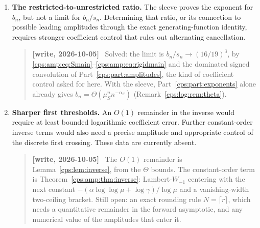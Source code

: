\documentclass[11pt,letterpaper]{article}
\numberwithin{equation}{section}
\theoremstyle{remark}\newtheorem{remark}[theorem]{Remark}
\newenvironment{writenotelog}{\begin{quote}\small\sloppy\textbf{[write, 2026-10-05]}\ }{\end{quote}}
\begin{document}
\begin{enumerate}
\begin{writenotelog}
Still open. The leading equivalents now exist (Theorem~\ref{cps:amp:thm:main}); no rate and no
correction term is proved in any Part.
\end{writenotelog}
\item \textbf{The restricted-to-unrestricted ratio.}
The sleeve proves the exponent for $b_n$, but not a limit for $b_n/s_n$.
Determining that ratio, or its connection to possible leading amplitudes
through the exact generating-function identity, requires stronger
coefficient control that rules out alternating cancellation.

\begin{writenotelog}
Solved: the limit is $b_n/s_n\to(16/19)^3$, by \eqref{cps:amp:eq:Smain}--\eqref{cps:amp:eq:rigidmain}
and the dominated signed convolution of Part~\ref{cps:part:amplitudes}, the kind of coefficient
control asked for here. With the sleeve, Part~\ref{cps:part:exponents} alone already gives
$b_n=\Theta(\mu_S^nn^{-\alpha_S})$ (Remark~\ref{cps:log:rem:theta}).
\end{writenotelog}
\item \textbf{Sharper first thresholds.}
An $O(1)$ remainder in the inverse would require at least bounded
logarithmic coefficient error. Further constant-order inverse terms
would also need a precise amplitude and appropriate control of the
discrete first crossing. These data are currently absent.

\begin{writenotelog}
The $O(1)$ remainder is Lemma~\ref{cps:lem:inverse}, from the $\Theta$ bounds. The constant-order
term is Theorem~\ref{cps:amp:thm:inverse}: Lambert-$W_{-1}$ centering with the next constant
$-(\alpha\log\log\mu+\log\gamma)/\log\mu$ and a vanishing-width two-ceiling bracket. Still open: an
exact rounding rule $N=\lceil r\rceil$, which needs a quantitative remainder in the forward
asymptotic, and any numerical value of the amplitudes that enter it.
\end{writenotelog}


\end{enumerate}
\end{document}
